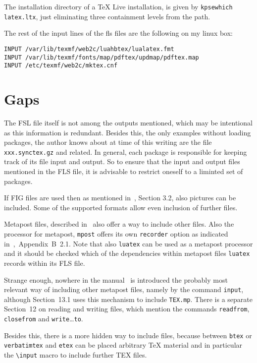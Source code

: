 \documentclass[a4paper, english]{article}%
\begin{document}
The installation directory of a \TeX{} Live installation, 
is given by \texttt{kpsewhich latex.ltx}, 
just eliminating three containment levels from the path. 

The rest of the input lines of the fls files are the following on my linux box: 
%
\begin{verbatim}
INPUT /var/lib/texmf/web2c/luahbtex/lualatex.fmt
INPUT /var/lib/texmf/fonts/map/pdftex/updmap/pdftex.map
INPUT /etc/texmf/web2c/mktex.cnf
\end{verbatim}

\section{Gaps}\label{sec:gaps}

The FSL file itself is not among the outputs mentioned, 
which may be intentional as this information is redundant. 
Besides this, the only examples without loading packages, 
the author knows about at time of this writing 
are the file \texttt{xxx.synctex.gz} and related. 
In general, each package is responsible for keeping track of its file input and output. 
So to ensure that the input and output files mentioned in the FLS file, 
it is advisable to restrict oneself to a liminted set of packages. 

If FIG files are used then as mentioned in~\cite{XFigF}, Section 3.2, 
also pictures can be included. 
Some of the supported formats allow even inclusion of further files. 

Metapost files, described in~\cite{MPost} also offer a way to include other files. 
Also the processor for metapost, \texttt{mpost} offers its own \texttt{recorder} option 
as indicated in~\cite{MPost},~Appendix~B~2.1. 
Note that also \texttt{luatex} can be used as a metapost processor 
and it should be checked which of the dependencies within metapost files 
\texttt{luatex} records within its FLS file. 

Strange enough, nowhere in the manual~\cite{MPost} 
is introduced the probably most relevant way of including other metapost files, 
namely by the command \texttt{input}, 
although Section~13.1 uses this mechanism to include \texttt{TEX.mp}. 
There is a separate Section~12 on reading and writing files, 
which mention the commands \texttt{readfrom}, \texttt{closefrom} 
and \texttt{write}\dots\texttt{to}. 

Besides this, there is a more hidden way to include files, 
because between \texttt{btex} or \texttt{verbatimtex} and \texttt{etex} 
can be placed arbitrary \TeX{} material 
and in particular the \texttt{\textbackslash{}input} macro to include further TEX files. 
\end{document}
